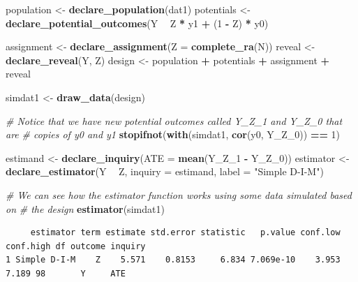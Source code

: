 \documentclass[
  12pt,
]{book}
\newenvironment{Shaded}{\begin{snugshade}}{\end{snugshade}}
\newcommand{\CommentTok}[1]{\textcolor[rgb]{0.56,0.35,0.01}{\textit{#1}}}
\newcommand{\DataTypeTok}[1]{\textcolor[rgb]{0.13,0.29,0.53}{#1}}
\newcommand{\DecValTok}[1]{\textcolor[rgb]{0.00,0.00,0.81}{#1}}
\newcommand{\KeywordTok}[1]{\textcolor[rgb]{0.13,0.29,0.53}{\textbf{#1}}}
\newcommand{\NormalTok}[1]{#1}
\newcommand{\OperatorTok}[1]{\textcolor[rgb]{0.81,0.36,0.00}{\textbf{#1}}}
\newcommand{\StringTok}[1]{\textcolor[rgb]{0.31,0.60,0.02}{#1}}
\theoremstyle{definition}
\theoremstyle{definition}
\theoremstyle{definition}
\theoremstyle{remark}
\begin{document}
\begin{Shaded}
\begin{Highlighting}[]
\NormalTok{population <-}\StringTok{ }\KeywordTok{declare_population}\NormalTok{(dat1)}
\NormalTok{potentials <-}\StringTok{ }\KeywordTok{declare_potential_outcomes}\NormalTok{(Y }\OperatorTok{~}\StringTok{ }\NormalTok{Z }\OperatorTok{*}\StringTok{ }\NormalTok{y1 }\OperatorTok{+}\StringTok{ }\NormalTok{(}\DecValTok{1} \OperatorTok{-}\StringTok{ }\NormalTok{Z) }\OperatorTok{*}\StringTok{ }\NormalTok{y0)}

\NormalTok{assignment <-}\StringTok{ }\KeywordTok{declare_assignment}\NormalTok{(}\DataTypeTok{Z =} \KeywordTok{complete_ra}\NormalTok{(N))}
\NormalTok{reveal <-}\StringTok{ }\KeywordTok{declare_reveal}\NormalTok{(Y, Z)}
\NormalTok{design <-}\StringTok{ }\NormalTok{population }\OperatorTok{+}\StringTok{ }\NormalTok{potentials }\OperatorTok{+}\StringTok{ }\NormalTok{assignment }\OperatorTok{+}\StringTok{ }\NormalTok{reveal}

\NormalTok{simdat1 <-}\StringTok{ }\KeywordTok{draw_data}\NormalTok{(design)}

\CommentTok{# Notice that we have new potential outcomes called Y_Z_1 and Y_Z_0 that are}
\CommentTok{# copies of y0 and y1}
\KeywordTok{stopifnot}\NormalTok{(}\KeywordTok{with}\NormalTok{(simdat1, }\KeywordTok{cor}\NormalTok{(y0, Y_Z_}\DecValTok{0}\NormalTok{)) }\OperatorTok{==}\StringTok{ }\DecValTok{1}\NormalTok{)}

\NormalTok{estimand <-}\StringTok{ }\KeywordTok{declare_inquiry}\NormalTok{(}\DataTypeTok{ATE =} \KeywordTok{mean}\NormalTok{(Y_Z_}\DecValTok{1} \OperatorTok{-}\StringTok{ }\NormalTok{Y_Z_}\DecValTok{0}\NormalTok{))}
\NormalTok{estimator <-}\StringTok{ }\KeywordTok{declare_estimator}\NormalTok{(Y }\OperatorTok{~}\StringTok{ }\NormalTok{Z, }\DataTypeTok{inquiry =}\NormalTok{ estimand, }\DataTypeTok{label =} \StringTok{"Simple D-I-M"}\NormalTok{)}

\CommentTok{# We can see how the estimator function works using some data simulated based on}
\CommentTok{# the design}
\KeywordTok{estimator}\NormalTok{(simdat1)}
\end{Highlighting}
\end{Shaded}

\begin{verbatim}
     estimator term estimate std.error statistic   p.value conf.low conf.high df outcome inquiry
1 Simple D-I-M    Z    5.571    0.8153     6.834 7.069e-10    3.953     7.189 98       Y     ATE
\end{verbatim}
\end{document}

